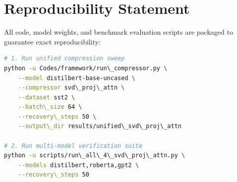\section{Reproducibility Statement}
All code, model weights, and benchmark evaluation scripts are packaged to guarantee exact reproducibility:
\begin{lstlisting}[language=bash]
# 1. Run unified compression sweep
python -u Codes/framework/run\_compressor.py \
    --model distilbert-base-uncased \
    --compressor svd\_proj\_attn \
    --dataset sst2 \
    --batch\_size 64 \
    --recovery\_steps 50 \
    --output\_dir results/unified\_svd\_proj\_attn

# 2. Run multi-model verification suite
python -u scripts/run\_all\_4\_svd\_proj\_attn.py \
    --models distilbert,roberta,gpt2 \
    --recovery\_steps 50
\end{lstlisting}
